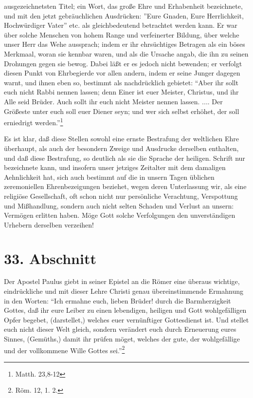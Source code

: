 ausgezeichnetsten Titel; ein Wort, das große Ehre und Erhabenheit bezeichnete,
und mit den jetzt gebräuchlichen Ausdrücken: ''Eure Gnaden, Eure Herrlichkeit,
Hochwürdiger Vater'' etc. als gleichbedeutend betrachtet werden kann. Er war
über solche Menschen von hohem Range und verfeinerter Bildung, über welche unser
Herr das Wehe aussprach; indem er ihr ehrsüchtiges Betragen als ein böses
Merkmaal, woran sie kennbar waren, und als die Ursache angab, die ihn zu seinen
Drohungen gegen sie bewog. Dabei läßt er es jedoch nicht bewenden; er verfolgt
diesen Punkt von Ehrbegierde vor allen andern, indem er seine Junger dagegen
warnt, und ihnen eben so, bestimmt als nachdrücklich gebietet: "`Aber ihr sollt
euch nicht Rabbi nennen lassen; denn Einer ist euer Meister, Christus, und ihr
Alle seid Brüder. Auch sollt ihr euch nicht Meister nennen lassen. .... Der
Größeste unter euch soll euer Diener seyn; und wer sich selbst erhöhet, der soll
erniedrigt werden."'\footnote{Matth. 23,8-12}

\medskip

Es ist klar, daß diese Stellen sowohl eine ernste Bestrafung der weltlichen Ehre
überhaupt, als auch der besondern Zweige und Ausdrucke derselben enthalten, und
daß diese Bestrafung, so deutlich als sie die Sprache der heiligen. Schrift nur
bezeichnete kann, und insofern unser jetziges Zeitalter mit dem damaligen
Aehnlichkeit hat, sich auch bestimmt auf die in unsern Tagen üblichen
zeremoniellen Ehrenbezeigungen beziehet, wegen deren Unterlassung wir, als eine
religiöse Gesellschaft, oft schon nicht nur persönliche Verachtung, Verspottung
und Mißhandlung, sondern auch nicht selten Schaden und Verlust an unsern:
Vermögen erlitten haben. Möge Gott solche Verfolgungen den unverständigen
Urhebern derselben verzeihen!

\section{33. Abschnitt} \label{kap9_ab33}

Der Apostel Paulus giebt in seiner Epistel an die Römer eine überaus wichtige,
eindrückliche und mit dieser Lehre Christi genau übereinstimmende Ermahnung in
den Worten: "`Ich ermahne euch, lieben Brüder! durch die Barmherzigkeit Gottes,
daß ihr eure Leiber zu einen lebendigen, heiligen und Gott wohlgefälligen Opfer
begebet, (darstellet,) welches euer vernünftiger Gottesdienst ist. Und stellet
euch nicht dieser Welt gleich, sondern verändert euch durch Erneuerung eures
Sinnes, (Gemüths,) damit ihr prüfen möget, welches der gute, der wohlgefällige
und der vollkommene Wille Gottes sei."'\footnote{Röm. 12, 1. 2.}

